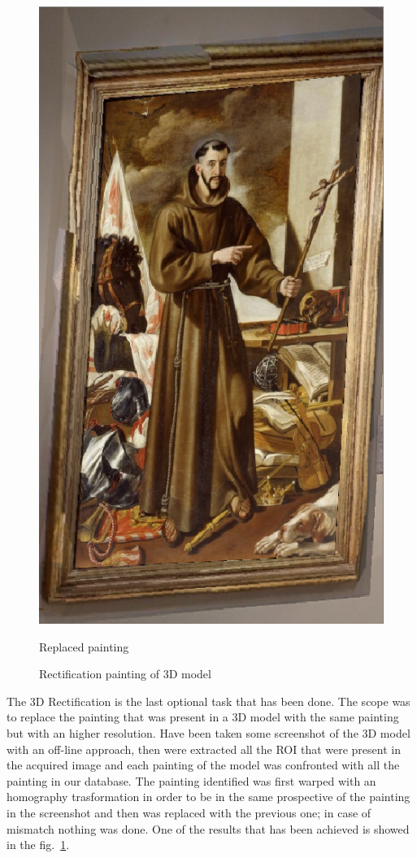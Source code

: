 \begin{figure}[h]
      \includegraphics[width=\linewidth]{pictures/painting_detection/3d_rectification_warped.PNG}
      \caption*{Replaced painting}\label{fig:rectification_warped}
    \endminipage\hfill
    \caption{Rectification painting of 3D model}\label{fig:3d-warping}
\end{figure}


The 3D Rectification is the last optional task that has been done. The scope was to replace the painting that was present in a 3D model with the same painting but with an higher resolution. Have been taken some screenshot of the 3D model with an off-line approach, then were extracted all the ROI that were present in the acquired image and each painting of the model was confronted with all the painting in our database. The painting identified was first warped with an homography trasformation in order to be in the same prospective of the painting in the screenshot and then was replaced with the previous one; in case of mismatch nothing was done. One of the results that has been achieved is showed in the fig.~\ref{fig:3d-warping}.
